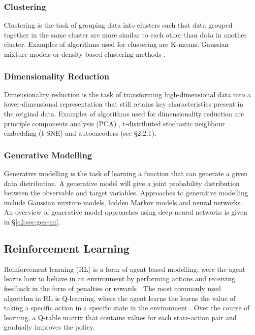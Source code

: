 \subsubsection{Clustering}

Clustering is the task of grouping data into clusters such that data grouped together in the same cluster are more similar to each other than data in another cluster. 
Examples of algorithms used for clustering are K-means, Gaussian mixture models or density-based clustering methods \citep{xu2005survey}.

\subsubsection{Dimensionality Reduction}

Dimensionality reduction is the task of transforming high-dimensional data into a lower-dimensional representation that still retains key characteristics present in the original data. 
Examples of algorithms used for dimensionality reduction are principle components analysis (PCA) \citep{pearson1901liii}, t-distributed stochastic neighbour embedding (t-SNE) \citep{hinton2002stochastic} and autoencoders (see \S2.2.1). 

\subsubsection{Generative Modelling}

Generative modelling is the task of learning a function that can generate a given data distribution. 
A generative model will give a joint probability distribution between the observable and target variables. 
Approaches to generative modelling include Gaussian mixture models, hidden Markov models and neural networks. 
An overview of generative model approaches using deep neural networks is given in \S \ref{c2:sec:gen-nn}.

\subsection{Reinforcement Learning}
\label{c2:subsec:reinforcement}

Reinforcement learning (RL) is a form of agent based modelling, were the agent learns how to behave in an environment by performing actions and receiving feedback in the form of penalties or rewards \citep{sutton1999reinforcement}. 
The most commonly used algorithm in RL is Q-learning, where the agent learns the learns the value of taking a specific action in a specific state in the environment \citep{watkins1992q}.
Over the course of learning, a Q-table matrix that contains values for each state-action pair and gradually improves the policy.

